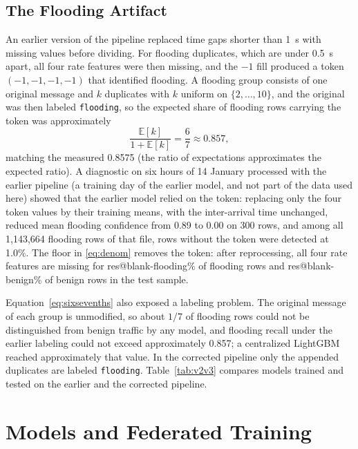 \documentclass[conference]{IEEEtran}
\makeatletter
\providecommand{\R}[1]{\csname res@#1\endcsname}
\newcommand{\flood}{\texttt{flooding}}
\makeatother
\begin{document}
\subsection{The Flooding Artifact}\label{sec:artifact}
An earlier version of the pipeline replaced time gaps shorter than 1~s with missing values before dividing. For flooding duplicates, which are under 0.5~s apart, all four rate features were then missing, and the $-1$ fill produced a token $(-1,-1,-1,-1)$ that identified flooding. A flooding group consists of one original message and $k$ duplicates with $k$ uniform on $\{2,\dots,10\}$, and the original was then labeled \flood, so the expected share of flooding rows carrying the token was approximately
\begin{equation}\frac{\mathbb{E}[k]}{1+\mathbb{E}[k]}=\frac{6}{7}\approx0.857,\label{eq:sixsevenths}\end{equation}
matching the measured 0.8575 (the ratio of expectations approximates the expected ratio). A diagnostic on six hours of 14 January processed with the earlier pipeline (a training day of the earlier model, and not part of the data used here) showed that the earlier model relied on the token: replacing only the four token values by their training means, with the inter-arrival time unchanged, reduced mean flooding confidence from 0.89 to 0.00 on 300 rows, and among all 1,143,664 flooding rows of that file, rows without the token were detected at 1.0\%. The floor in \eqref{eq:denom} removes the token: after reprocessing, all four rate features are missing for \R{blank-flooding}\% of flooding rows and \R{blank-benign}\% of benign rows in the test sample.

Equation~\eqref{eq:sixsevenths} also exposed a labeling problem. The original message of each group is unmodified, so about $1/7$ of flooding rows could not be distinguished from benign traffic by any model, and flooding recall under the earlier labeling could not exceed approximately 0.857; a centralized LightGBM reached approximately that value. In the corrected pipeline only the appended duplicates are labeled \flood. Table~\ref{tab:v2v3} compares models trained and tested on the earlier and the corrected pipeline.

\section{Models and Federated Training}\label{sec:models}
\end{document}
